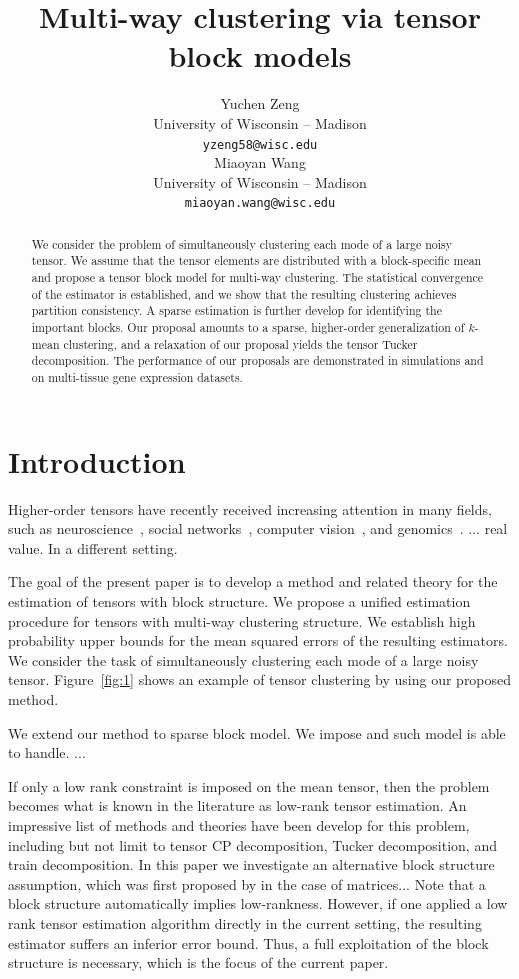 \documentclass{article}
\title{Multi-way clustering via tensor block models}
\author{%
Yuchen Zeng \\
 University of Wisconsin -- Madison\\
 \texttt{yzeng58@wisc.edu} \\
\And
Miaoyan Wang \\
 University of Wisconsin -- Madison\\
\texttt{miaoyan.wang@wisc.edu} \\
}
\begin{document}
\maketitle

\begin{abstract}
We consider the problem of simultaneously clustering each mode of a large noisy tensor. We assume that the tensor elements are distributed with a block-specific mean and propose a tensor block model for multi-way clustering. The statistical convergence of the estimator is established, and we show that the resulting clustering achieves partition consistency. A sparse estimation is further develop for identifying the important blocks. Our proposal amounts to a sparse, higher-order generalization of $k$-mean clustering, and a relaxation of our proposal yields the tensor Tucker decomposition. The performance of our proposals are demonstrated in simulations and on multi-tissue gene expression datasets.
\end{abstract}

\section{Introduction}

Higher-order tensors have recently received increasing attention in many fields, such as neuroscience~\cite{cong2015tensor,zhou2013tensor}, social networks~\cite{nickel2011three,socher2013reasoning}, computer vision~\cite{tang2013tensor,liu2013tensor}, and genomics~\cite{wang2017three,hore2016tensor}. ... real value. In a different setting. 

The goal of the present paper is to develop a method and related theory for the estimation of tensors with block structure. We propose a unified estimation procedure for tensors with multi-way clustering structure. We establish high probability upper bounds for the mean squared errors of the resulting estimators. We consider the task of simultaneously clustering each mode of a large noisy tensor. Figure~\eqref{fig:1} shows an example of tensor clustering by using our proposed method.

We extend our method to sparse block model. We impose and such model is able to handle. ...

If only a low rank constraint is imposed on the mean tensor, then the problem becomes what is known in the literature as low-rank tensor estimation. An impressive list of methods and theories have been develop for this problem, including but not limit to tensor CP decomposition, Tucker decomposition, and train decomposition. In this paper we investigate an alternative block structure assumption, which was first proposed by in the case of matrices... Note that a block structure automatically implies low-rankness. However, if one applied a low rank tensor estimation algorithm directly in the current setting, the resulting estimator suffers an inferior error bound. Thus, a full exploitation of the block structure is necessary, which is the focus of the current paper. 
\end{document}
